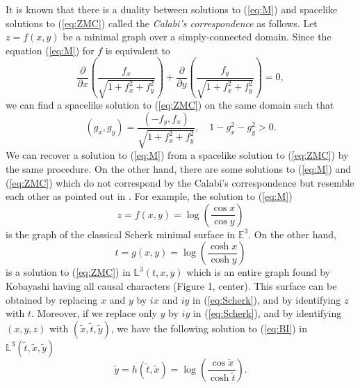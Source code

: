 \documentclass[12pt,amstex]{amsart}%
\theoremstyle{plain} %
\theoremstyle{definition}
\begin{document}
It is known that there is a duality between solutions to (\ref{eq:M}) and spacelike solutions to (\ref{eq:ZMC}) called the {\it Calabi's correspondence} \cite{Calabi} as follows. 
Let $z=f(x,y)$ be a minimal graph over a simply-connected domain. Since the equation (\ref{eq:M}) for $f$ is equivalent to
\[
\frac{\partial}{\partial x}\left(\frac{f_x}{\sqrt{1+f_x^2+f_y^2}}\right)+\frac{\partial}{\partial y}\left(\frac{f_y}{\sqrt{1+f_x^2+f_y^2}}\right)=0,
\]
we can find a spacelike solution to (\ref{eq:ZMC}) on the same domain such that 
\[
(g_x,g_y)=\frac{(-f_y,f_x)}{\sqrt{1+f_x^2+f_y^2}},\quad 1-g_x^2-g_y^2>0.
\]
We can recover a solution to (\ref{eq:M}) from a spacelike solution to (\ref{eq:ZMC}) by the same procedure. On the other hand, there are some solutions to (\ref{eq:M}) and (\ref{eq:ZMC}) which do not correspond by the Calabi's correspondence but resemble each other as pointed out in \cite{FujimoriETAL1,Kobayashi}. For example, the solution to (\ref{eq:M}) 
\begin{equation}\label{eq:Scherk}
z=f(x,y)=\log{\left(\frac{\cos{x}}{\cos{y}}\right)}
\end{equation}
is the graph of the classical Scherk minimal surface in $\mathbb{E}^3$. On the other hand, 
\begin{equation}\label{eq:ZMC_Scherk}
t=g(x,y)=\log{\left(\frac{\cosh{x}}{\cosh{y}}\right)}
\end{equation}
is a solution to (\ref{eq:ZMC}) in $\mathbb{L}^3(t,x,y)$ which is an entire graph found by Kobayashi \cite{Kobayashi} having all causal characters (Figure 1, center). This surface can be obtained by replacing $x$ and $y$ by $ix$ and $iy$ in (\ref{eq:Scherk}), and by identifying $z$ with $t$. Moreover, if we replace only $y$ by $iy$ in (\ref{eq:Scherk}), and by identifying $(x,y,z)$ with $(\tilde{x},\tilde{t},\tilde{y})$, we have the following solution to (\ref{eq:BI}) in $\mathbb{L}^3(\tilde{t},\tilde{x},\tilde{y})$
\[
\tilde{y}=h(\tilde{t},\tilde{x})=\log{\left(\frac{\cos{\tilde{x}}}{\cosh{\tilde{t}}}\right)}.
\]
\end{document}
